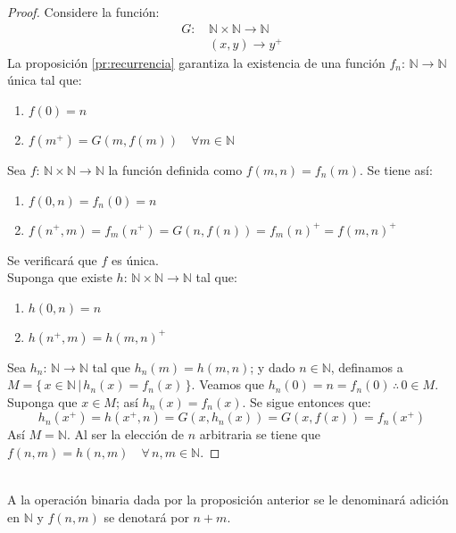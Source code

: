     \begin{proof}
        Considere la función:
        \begin{align*}
            G:& \, \mathbb{N} \times \mathbb{N} \rightarrow \mathbb{N} \\
              & \, (x,y) \rightarrow y^+
        \end{align*}
        La proposición \ref{pr:recurrencia} garantiza la existencia de una
        función $f_n:\, \mathbb{N}\rightarrow \mathbb{N} $ única tal que:
        \begin{enumerate}
            \item $f(0) = n$
            \item $f(m^+) = G(m, f(m)) \quad \forall m \in \mathbb{N}$
        \end{enumerate}
        Sea $f:\, \mathbb{N} \times \mathbb{N} \rightarrow \mathbb{N}$ la
        función definida como $f(m,n) = f_n(m)$. Se tiene así:
        \begin{enumerate}
            \item $f(0,n) = f_n(0)=n$
            \item $f(n^+,m) = f_m(n^+) = G(n, f(n))= f_m(n)^+ = f(m,n)^+$
        \end{enumerate}
        Se verificará que $f$ es única. \\
        Suponga que existe $h:\, \mathbb{N} \times \mathbb{N} \rightarrow
        \mathbb{N}$ tal que: 
        \begin{enumerate}
            \item $h(0,n) =n $
            \item $h(n^+,m) = h(m,n)^+$
        \end{enumerate}
        Sea $h_n: \, \mathbb{N} \rightarrow \mathbb{N}$ tal que $h_n(m) =
        h(m,n)$; y dado $n \in \mathbb{N}$, definamos a $M = \{\, x \in \mathbb{N}
        \, | \, h_n(x) = f_n(x) \, \}$.
        Veamos que $h_n(0)=n=f_n(0) \, \therefore \, 0 \in M$. \\
        Suponga que $x \in M$; así $h_n(x) = f_n(x)$. Se sigue entonces que:
        \[
        h_n(x^+)=h(x^+,n)=G(x,h_n(x))=G(x, f(x))= f_n(x^+)
        \]
        Así $M=\mathbb{N}$. Al ser la elección de $n$ arbitraria se tiene que
        $f(n,m)=h(n,m) \quad \forall \, n,m \in \mathbb{N}$.
    \end{proof}
    \\
    A la operación binaria dada por la proposición anterior se le denominará
    adición en $\mathbb{N}$ y $f(n,m)$ se denotará por $n + m$. 
    \vspace{1cm}

